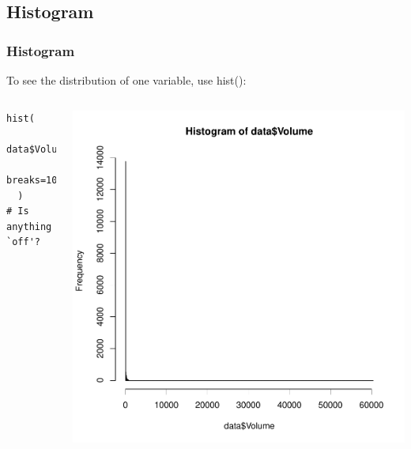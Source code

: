 
\subsection{Histogram}

\begin{frame}
	\frametitle{Histogram}
To see the distribution of one variable, use \ttfamily hist(): \normalfont

    \begin{columns}
  \begin{lstlisting}
hist(
  data$Volume, 
  breaks=1000
  )
# Is anything `off'?
  \end{lstlisting}

        \begin{center}
           \includegraphics[scale=0.3]{images/histogram.pdf}
        \end{center}  
\end{columns}

\newpage      


\end{frame}
